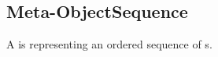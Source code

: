 \subsection{Meta-ObjectSequence}
\label{concept-Meta-ObjectSequence}

A  is representing an ordered sequence of s.





